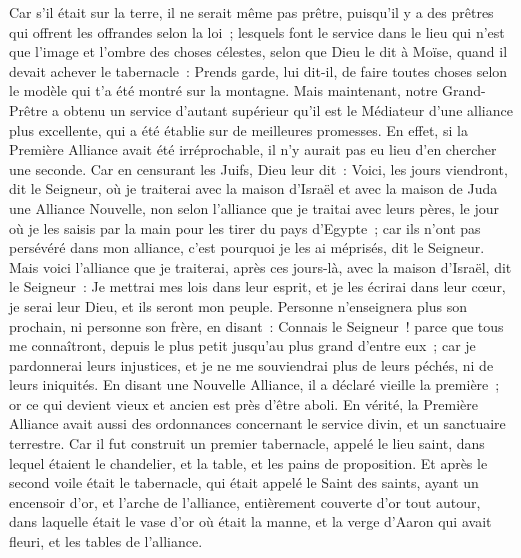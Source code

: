 \begin{multicols}{2}
Car s'il était sur la terre, il ne serait même pas prêtre, puisqu'il y a des prêtres qui offrent les offrandes selon la loi~;
lesquels font le service dans le lieu qui n'est que l'image et l'ombre des choses célestes, selon que Dieu le dit à Moïse, quand il devait achever le tabernacle~: Prends garde, lui dit-il, de faire toutes choses selon le modèle qui t'a été montré sur la montagne.
Mais maintenant, notre Grand-Prêtre a obtenu un service d'autant supérieur qu'il est le Médiateur d'une alliance plus excellente, qui a été établie sur de meilleures promesses.
En effet, si la Première Alliance avait été irréprochable, il n'y aurait pas eu lieu d'en chercher une seconde.
Car en censurant les Juifs, Dieu leur dit~: Voici, les jours viendront, dit le Seigneur, où je traiterai avec la maison d'Israël et avec la maison de Juda une Alliance Nouvelle,
non selon l'alliance que je traitai avec leurs pères, le jour où je les saisis par la main pour les tirer du pays d'Egypte~; car ils n'ont pas persévéré dans mon alliance, c'est pourquoi je les ai méprisés, dit le Seigneur.
Mais voici l'alliance que je traiterai, après ces jours-là, avec la maison d'Israël, dit le Seigneur~: Je mettrai mes lois dans leur esprit, et je les écrirai dans leur cœur, je serai leur Dieu, et ils seront mon peuple.
Personne n'enseignera plus son prochain, ni personne son frère, en disant~: Connais le Seigneur~! parce que tous me connaîtront, depuis le plus petit jusqu'au plus grand d'entre eux~;
car je pardonnerai leurs injustices, et je ne me souviendrai plus de leurs péchés, ni de leurs iniquités.
En disant une Nouvelle Alliance, il a déclaré vieille la première~; or ce qui devient vieux et ancien est près d'être aboli.
\VerseOne{}En vérité, la Première Alliance avait aussi des ordonnances concernant le service divin, et un sanctuaire terrestre.
Car il fut construit un premier tabernacle, appelé le lieu saint, dans lequel étaient le chandelier, et la table, et les pains de proposition.
Et après le second voile était le tabernacle, qui était appelé le Saint des saints,
ayant un encensoir d'or, et l'arche de l'alliance, entièrement couverte d'or tout autour, dans laquelle était le vase d'or où était la manne, et la verge d'Aaron qui avait fleuri, et les tables de l'alliance.

\end{multicols}
